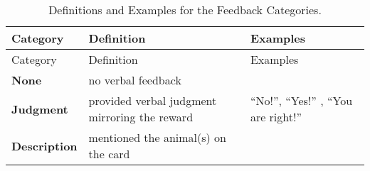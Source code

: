 \documentclass[,man,floatsintext]{apa6}
\begin{document}
\begin{longtable}[]{@{}lll@{}}
\caption{\label{tab:feedbackCat} Definitions and Examples for the Feedback Categories.}\tabularnewline
\toprule
\begin{minipage}[b]{0.14\columnwidth}\raggedright
Category\strut
\end{minipage} & \begin{minipage}[b]{0.46\columnwidth}\raggedright
Definition\strut
\end{minipage} & \begin{minipage}[b]{0.31\columnwidth}\raggedright
Examples\strut
\end{minipage}\tabularnewline
\midrule
\endfirsthead
\toprule
\begin{minipage}[b]{0.14\columnwidth}\raggedright
Category\strut
\end{minipage} & \begin{minipage}[b]{0.46\columnwidth}\raggedright
Definition\strut
\end{minipage} & \begin{minipage}[b]{0.31\columnwidth}\raggedright
Examples\strut
\end{minipage}\tabularnewline
\midrule
\endhead
\begin{minipage}[t]{0.14\columnwidth}\raggedright
\textbf{None}\strut
\end{minipage} & \begin{minipage}[t]{0.46\columnwidth}\raggedright
no verbal feedback\strut
\end{minipage} & \begin{minipage}[t]{0.31\columnwidth}\raggedright
\strut
\end{minipage}\tabularnewline
\begin{minipage}[t]{0.14\columnwidth}\raggedright
\textbf{Judgment}\strut
\end{minipage} & \begin{minipage}[t]{0.46\columnwidth}\raggedright
provided verbal judgment mirroring the reward\strut
\end{minipage} & \begin{minipage}[t]{0.31\columnwidth}\raggedright
\enquote{No!}, \enquote{Yes!} , \enquote{You are right!}\strut
\end{minipage}\tabularnewline
\begin{minipage}[t]{0.14\columnwidth}\raggedright
\textbf{Description}\strut
\end{minipage} & \begin{minipage}[t]{0.46\columnwidth}\raggedright
mentioned the animal(s) on the card\strut

\end{minipage}
\end{longtable}
\end{document}
